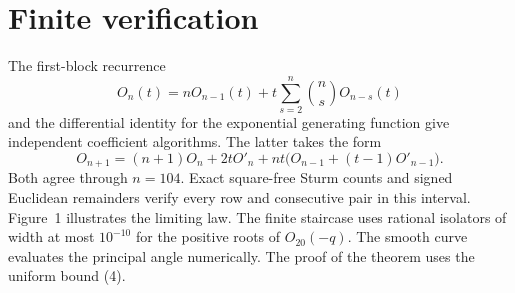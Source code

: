 \documentclass[11pt]{article}
\begin{document}
\section{Finite verification}
The first-block recurrence
\[
 O_n(t)=nO_{n-1}(t)+t\sum_{s=2}^n\binom ns O_{n-s}(t)
\]
and the differential identity for the exponential generating function give independent coefficient algorithms. The latter takes the form
\[
 O_{n+1}=(n+1)O_n+2tO'_n+nt\big(O_{n-1}+(t-1)O'_{n-1}\big).
\]
Both agree through $n=104$. Exact square-free Sturm counts and signed Euclidean remainders verify every row and consecutive pair in this interval. Figure~1 illustrates the limiting law. The finite staircase uses rational isolators of width at most $10^{-10}$ for the positive roots of $O_{20}(-q)$. The smooth curve evaluates the principal angle numerically. The proof of the theorem uses the uniform bound (4).
\end{document}
